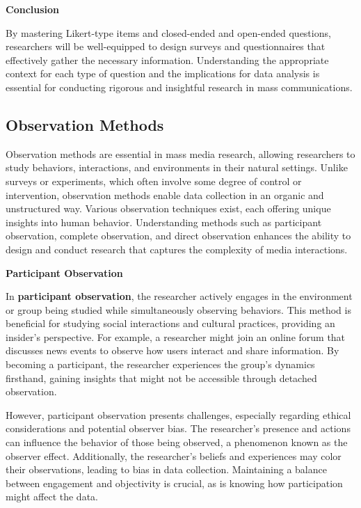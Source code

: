 \documentclass[
]{book}
\begin{document}
\textbf{Conclusion}

By mastering Likert-type items and closed-ended and open-ended questions, researchers will be well-equipped to design surveys and questionnaires that effectively gather the necessary information. Understanding the appropriate context for each type of question and the implications for data analysis is essential for conducting rigorous and insightful research in mass communications.

\subsection*{Observation Methods}\label{observation-methods}

Observation methods are essential in mass media research, allowing researchers to study behaviors, interactions, and environments in their natural settings. Unlike surveys or experiments, which often involve some degree of control or intervention, observation methods enable data collection in an organic and unstructured way. Various observation techniques exist, each offering unique insights into human behavior. Understanding methods such as participant observation, complete observation, and direct observation enhances the ability to design and conduct research that captures the complexity of media interactions.

\textbf{Participant Observation}

In \textbf{participant observation}, the researcher actively engages in the environment or group being studied while simultaneously observing behaviors. This method is beneficial for studying social interactions and cultural practices, providing an insider's perspective. For example, a researcher might join an online forum that discusses news events to observe how users interact and share information. By becoming a participant, the researcher experiences the group's dynamics firsthand, gaining insights that might not be accessible through detached observation.

However, participant observation presents challenges, especially regarding ethical considerations and potential observer bias. The researcher's presence and actions can influence the behavior of those being observed, a phenomenon known as the observer effect. Additionally, the researcher's beliefs and experiences may color their observations, leading to bias in data collection. Maintaining a balance between engagement and objectivity is crucial, as is knowing how participation might affect the data.
\end{document}
